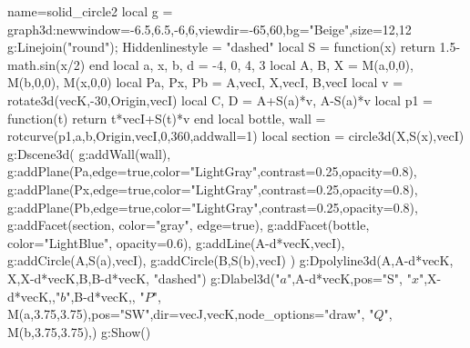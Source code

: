 \begin{luadraw}{name=solid_circle2}
local g = graph3d:new{window={-6.5,6.5,-6,6},viewdir={-65,60},bg="Beige",size={12,12}}
g:Linejoin("round"); Hiddenlinestyle = "dashed"
local S = function(x) return 1.5-math.sin(x/2) end
local a, x, b, d = -4, 0, 4, 3
local A, B, X = M(a,0,0), M(b,0,0), M(x,0,0)
local Pa, Px, Pb = {A,vecI}, {X,vecI}, {B,vecI}
local v = rotate3d(vecK,-30,{Origin,vecI})
local C, D = A+S(a)*v, A-S(a)*v
local p1 = function(t) return t*vecI+S(t)*v end
local bottle, wall = rotcurve(p1,a,b,{Origin,vecI},0,360,{addwall=1})
local section = circle3d(X,S(x),vecI)
g:Dscene3d(
    g:addWall(wall), 
    g:addPlane(Pa,{edge=true,color="LightGray",contrast=0.25,opacity=0.8}),
    g:addPlane(Px,{edge=true,color="LightGray",contrast=0.25,opacity=0.8}),
    g:addPlane(Pb,{edge=true,color="LightGray",contrast=0.25,opacity=0.8}),
    g:addFacet(section, {color="gray", edge=true}),
    g:addFacet(bottle, {color="LightBlue", opacity=0.6}),
    g:addLine({A-d*vecK,vecI}),
    g:addCircle(A,S(a),vecI),
    g:addCircle(B,S(b),vecI)
)
g:Dpolyline3d({{A,A-d*vecK}, {X,X-d*vecK},{B,B-d*vecK}}, "dashed")
g:Dlabel3d("$a$",A-d*vecK,{pos="S"}, "$x$",X-d*vecK,{},"$b$",B-d*vecK,{},
    "$P$", M(a,3.75,3.75),{pos="SW",dir={vecJ,vecK},node_options="draw"},
    "$Q$", M(b,3.75,3.75),{})
g:Show()
\end{luadraw}
